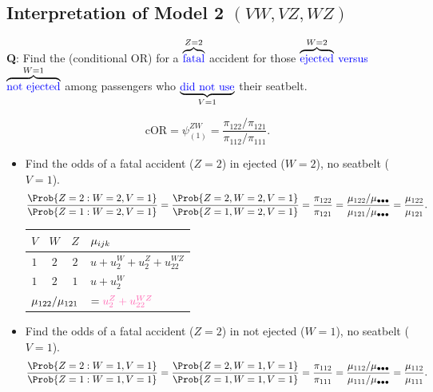 \documentclass{article}\usepackage[]{graphicx}\usepackage[svgnames]{xcolor}
\providecommand\given{} %
\renewcommand\given{\nonscript\:\delimsize\vert\nonscript\:\mathopen{}}%
\renewcommand\given{\nonscript\:\delimsize\vert\nonscript\:\mathopen{}}%
\renewcommand\given{\nonscript\:\delimsize\vert\nonscript\:\mathopen{}}%
\renewcommand\given{\nonscript\:\delimsize\vert\nonscript\:\mathopen{}}%
\renewcommand\given{\nonscript\:\delimsize\vert\nonscript\:\mathopen{}}%
\renewcommand\given{\nonscript\:\delimsize\vert\nonscript\:\mathopen{}}%
\renewcommand\given{\nonscript\:\delimsize\vert\nonscript\:\mathopen{}}%
\renewcommand\given{\nonscript\:\delimsize\vert\nonscript\:\mathopen{}}%
\renewcommand\given{\nonscript\:\delimsize\vert\nonscript\:\mathopen{}}%
\renewcommand\given{\nonscript\:\delimsize\vert\nonscript\:\mathopen{}}%
\renewcommand\given{\nonscript\:\delimsize\vert\nonscript\:\mathopen{}}%
\let\log\relax%
\newcommand{\cOR}{\text{cOR}}%
\renewcommand\given{:}
\begin{document}
\subsection*{Interpretation of Model 2 $(VW , VZ , WZ )$}
\begin{Example}{}
    \textbf{Q}: Find the (conditional OR) for a $ \overbrace{\text{\textcolor{Blue}{fatal}}}^{Z=2} $ accident for those
    $ \overbrace{\text{\textcolor{Blue}{ejected}}}^{W=2} $ \textcolor{Blue}{versus} $ \overbrace{\text{\textcolor{Blue}{not ejected}}}^{W=1} $
    among passengers who $ \underbrace{\text{\textcolor{Blue}{did not use}}}_{V=1} $ their seatbelt.
\end{Example}
\[ \cOR=\psi_{(1)}^{ZW}=\frac{\pi_{122}/\pi_{121}}{\pi_{112}/\pi_{111}}. \]
\begin{itemize}
    \item Find the odds of a fatal accident ($Z = 2$) in ejected ($W = 2$), no seatbelt ($V = 1$).
          \[ \frac{\Prob{Z=2\given W=2,V=1}}{\Prob{Z=1\given W=2,V=1}}=\frac{\Prob{Z=2,W=2,V=1}}{\Prob{Z=1,W=2,V=1}}=\frac{\pi_{122}}{\pi_{121}}
              =\frac{\mu_{122}/\mu_{\bullet\bullet\bullet}}{\mu_{121}/\mu_{\bullet\bullet\bullet}}=\frac{\mu_{122}}{\mu_{121}}. \]
          \begin{table}[H]
              \centering
              \begin{tabular}{cccl}
                  $ V $                                           & $ W $                                     & $ Z $ & $ \log{\mu_{ijk}} $           \\
                  \midrule
                  $1$                                             & $2$                                       & $2$   & $ u+u_2^W+u_2^Z+u_{22}^{WZ} $ \\
                  $1$                                             & $2$                                       & $1$   & $ u+u_2^W $                   \\
                  \midrule
                  \multicolumn{3}{c}{$\log{\mu_{122}/\mu_{121}}$} & $=\textcolor{HotPink}{u_2^Z+u_{22}^{WZ}}$
              \end{tabular}
          \end{table}
    \item Find the odds of a fatal accident ($ Z=2 $) in not ejected ($ W=1 $), no seatbelt ($ V=1 $).
          \[ \frac{\Prob{Z=2\given W=1,V=1}}{\Prob{Z=1\given W=1,V=1}}=\frac{\Prob{Z=2,W=1,V=1}}{\Prob{Z=1,W=1,V=1}}=\frac{\pi_{112}}{\pi_{111}}
              =\frac{\mu_{112}/\mu_{\bullet\bullet\bullet}}{\mu_{111}/\mu_{\bullet\bullet\bullet}}=\frac{\mu_{112}}{\mu_{111}}. \]

\end{itemize}
\end{document}
